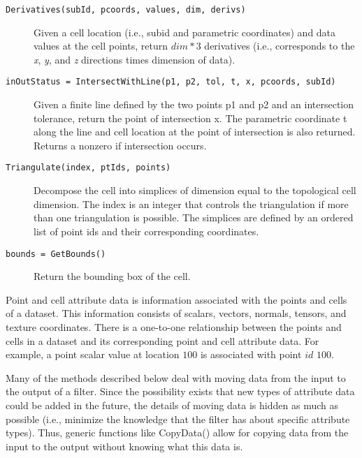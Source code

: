 \begin{description}[leftmargin=0cm,labelindent=0cm]
\begin{description}
    \item[\texttt{Derivatives(subId, pcoords, values, dim, derivs)}]
    Given a cell location (i.e., subid and parametric coordinates) and data values at the cell points, return $dim*3$ derivatives (i.e., corresponds to the \emph{x}, \emph{y}, and \emph{z} directions times dimension of data).

    \item[\texttt{inOutStatus = IntersectWithLine(p1, p2, tol, t, x, pcoords, subId)}] 
    Given a finite line defined by the two points p1 and p2 and an intersection tolerance, return the point of intersection x. The parametric coordinate t along the line and cell location at the point of intersection is also returned. Returns a nonzero if intersection occurs.

    \item[\texttt{Triangulate(index, ptIds, points)}]
    Decompose the cell into simplices of dimension equal to the topological cell dimension. The index is an integer that controls the triangulation if more than one triangulation  is possible. The simplices are defined by an ordered list of point ids and their corresponding coordinates.

    \item[\texttt{bounds = GetBounds()}]
    Return the bounding box of the cell.

    \end{description}

\item[Point and Cell Attribute Abstraction.\index{abstraction!dataset attribute|(}\index{dataset attribute!abstraction|(}] Point and cell attribute data is information associated with the points and cells of a dataset. This information consists of scalars, vectors, normals, tensors, and texture coordinates. There is a one-to-one relationship between the points and cells in a dataset and its corresponding point and cell attribute data. For example, a point scalar value at location $100$ is associated with point $id$ $100$.

Many of the methods described below deal with moving data from the input to the output of a filter. Since the possibility exists that new types of attribute data could be added in the future, the details of moving data is hidden as much as possible (i.e., minimize the knowledge that the filter has about specific attribute types). Thus, generic functions like CopyData() allow for copying data from the input to the output without knowing what this data is.
    \begin{description}


\end{description}
\end{description}
